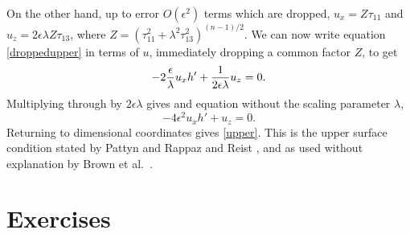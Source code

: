 \documentclass[11pt,final,reqno]{amsart}
\theoremstyle{remark}
\theoremstyle{definition}
\newcommand{\eps}{\epsilon}
\begin{document}
On the other hand, up to error $O(\eps^2)$ terms which are dropped, $u_x = Z \tau_{11}$ and $u_z = 2 \eps\lambda Z \tau_{13}$, where $Z=(\tau_{11}^2+\lambda^2\tau_{13}^2)^{(n-1)/2}$.  We can now write equation \eqref{droppedupper} in terms of $u$, immediately dropping a common factor $Z$, to get
   $$- 2 \eol u_x h' + \frac{1}{2\eps\lambda} u_z = 0.$$
Multiplying through by $2\eps\lambda$ gives and equation without the scaling parameter $\lambda$,
\begin{equation}
- 4 \eps^2 u_x h' + u_z = 0.  \label{sweet}
\end{equation}
Returning to dimensional coordinates gives \eqref{upper}.  This is the upper surface condition stated by Pattyn \cite{Pattyn03} and Rappaz and Reist \cite{RappazReist05}, and as used without explanation by Brown et al.~\cite{BrownSmithAhmadia2013}.


\newpage
\section{Exercises}

\renewcommand{\labelenumi}{\emph{\alph{enumi})}\quad}
\end{document}
